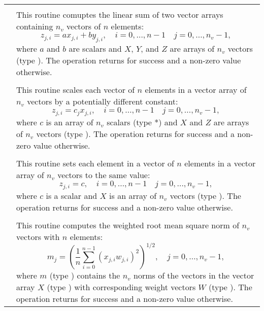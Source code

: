 \begin{xtabular}{|p{\colonec}|p{\coltwoc}|}

 &  \\
& This routine comuptes the linear sum of two vector arrays containing $n_v$
vectors of $n$ elements:
\begin{equation*}
z_{j,i} = a x_{j,i} + b y_{j,i}, \quad i=0,\ldots,n-1 \quad j=0,\ldots,n_v-1,
\end{equation*}
where $a$ and $b$ are  scalars and $X$, $Y$, and $Z$ are arrays of
$n_v$ vectors (type ). The operation returns  for success and
a non-zero value otherwise.
\\[2mm]

 &  \\
& This routine scales each vector of $n$ elements in a vector array of $n_v$
vectors by a potentially different constant:
\begin{equation*}
z_{j,i} = c_j x_{j,i}, \quad i=0,\ldots,n-1 \quad j=0,\ldots,n_v-1,
\end{equation*}
where $c$ is an array of $n_v$ scalars (type *) and $X$ and $Z$ are
arrays of $n_v$ vectors (type ). The operation returns  for
success and a non-zero value otherwise.
\\[2mm]

 &  \\
& This routine sets each element in a vector of $n$ elements in a vector array of
$n_v$ vectors to the same value:
\begin{equation*}
z_{j,i} = c, \quad i=0,\ldots,n-1 \quad j=0,\ldots,n_v-1,
\end{equation*}
where $c$ is a  scalar and $X$ is an array of $n_v$ vectors (type
). The operation returns  for success and a non-zero value
otherwise.
\\[2mm]

 &  \\
& This routine computes the weighted root mean square norm of $n_v$ vectors with
$n$ elements:
\begin{equation*}
m_j = \left( \frac1n \sum_{i=0}^{n-1} \left(x_{j,i} w_{j,i}\right)^2\right)^{1/2}, \quad j=0,\ldots,n_v-1,
\end{equation*}
where $m$ (type ) contains the $n_v$ norms of the vectors in the
vector array $X$ (type ) with corresponding weight vectors $W$
(type ). The operation returns  for success and a non-zero
value otherwise.
\\[2mm]


\end{xtabular}
